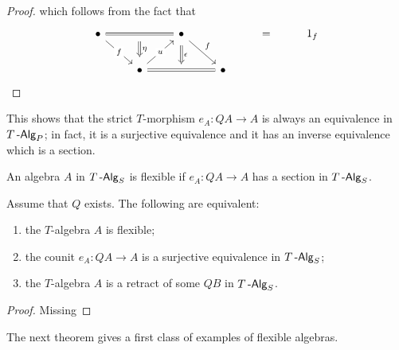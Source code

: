 \documentclass[a4paper,11pt,oneside,openany]{scrbook}
\begin{document}
\begin{proof}
    which follows from the fact that
    \[\begin{tikzcd}
        \bullet && \bullet && {=} & {1_f} \\
        & \bullet & {} & \bullet
        \arrow[""{name=0, anchor=center, inner sep=0}, Rightarrow, no head, from=1-1, to=1-3]
        \arrow["f"{description}, from=1-1, to=2-2]
        \arrow["u"{description}, from=2-2, to=1-3]
        \arrow["f", from=1-3, to=2-4]
        \arrow[Rightarrow, no head, from=2-2, to=2-4]
        \arrow["\epsilon", shorten <=4pt, shorten >=4pt, Rightarrow, from=1-3, to=2-3]
        \arrow["\eta", shorten <=6pt, shorten >=6pt, Rightarrow, from=0, to=2-2]
    \end{tikzcd}\]
\end{proof}

This shows that the strict $T$-morphism $e_A\colon QA\rightarrow A$ is always an
equivalence in $T\operatorname{-\mathsf{Alg}}_P$; in fact, it is a surjective equivalence and it has an
inverse equivalence which is a section.

\begin{defn}
    An algebra $A$ in $T\operatorname{-\mathsf{Alg}}_S$ is flexible if $e_A\colon QA\rightarrow A$ has a
    section in $T\operatorname{-\mathsf{Alg}}_S$.
\end{defn}

\begin{prop}
    Assume that $Q$ exists. The following are equivalent:
    \begin{enumerate}
        \item the $T$-algebra $A$ is flexible;
        \item the counit $e_A\colon QA\rightarrow A$ is a surjective equivalence
            in $T\operatorname{-\mathsf{Alg}}_S$;
        \item the $T$-algebra $A$ is a retract of some $QB$ in $T\operatorname{-\mathsf{Alg}}_S$.
    \end{enumerate}
\end{prop}
\begin{proof}
    Missing
\end{proof}

The next theorem gives a first class of examples of flexible algebras.
\end{document}
